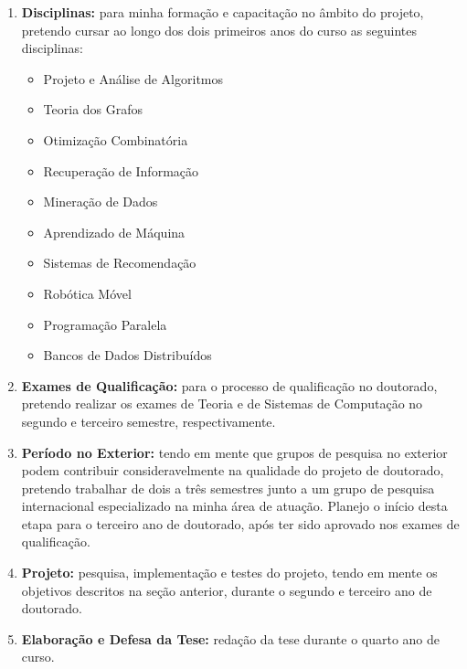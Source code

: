\documentclass[a4paper,12pt,titlepage]{article}
\begin{document}
\begin{enumerate}
\item{\textbf {Disciplinas:}} para minha formação e capacitação no âmbito do projeto, pretendo cursar ao longo dos dois primeiros anos do curso as seguintes disciplinas:

\begin{itemize}
\item Projeto e Análise de Algoritmos 
\item Teoria dos Grafos
\item Otimização Combinatória 
\item Recuperação de Informação
\item Mineração de Dados
\item Aprendizado de Máquina
\item Sistemas de Recomendação
\item Robótica Móvel
\item Programação Paralela 
\item Bancos de Dados Distribuídos 
\end{itemize}

\begin{comment}
-- Outras disciplinas interessantes
Seminários Avançados em Recuperação de Informação e Computação Social
Bancos de Dados Distribuídos 
Otimização em Redes 
Estágio em Docência I
Estágio em Docência II
Computação Ubíqua
Computação Natural 
Compiladores 
Programação Linear 
Fundamentos Teóricos da Computação
\end{comment}

\item{\textbf {Exames de Qualificação:}} para o processo de qualificação no doutorado, pretendo realizar os exames de Teoria e de Sistemas de Computação no segundo e terceiro semestre, respectivamente.

\item{\textbf {Período no Exterior:}} tendo em mente que grupos de pesquisa no exterior podem contribuir consideravelmente na qualidade do projeto de doutorado, pretendo trabalhar de dois a três semestres junto a um grupo de pesquisa internacional especializado na minha área de atuação. Planejo o início desta etapa para o terceiro ano de doutorado, após ter sido aprovado nos exames de qualificação.

\item{\textbf {Projeto:}} pesquisa, implementação e testes do projeto, tendo em mente os objetivos descritos na seção anterior, durante o segundo e terceiro ano de doutorado.

\item{\textbf {Elaboração e Defesa da Tese:}} redação da tese durante o quarto ano de curso.

\end {enumerate}
\end{document}

